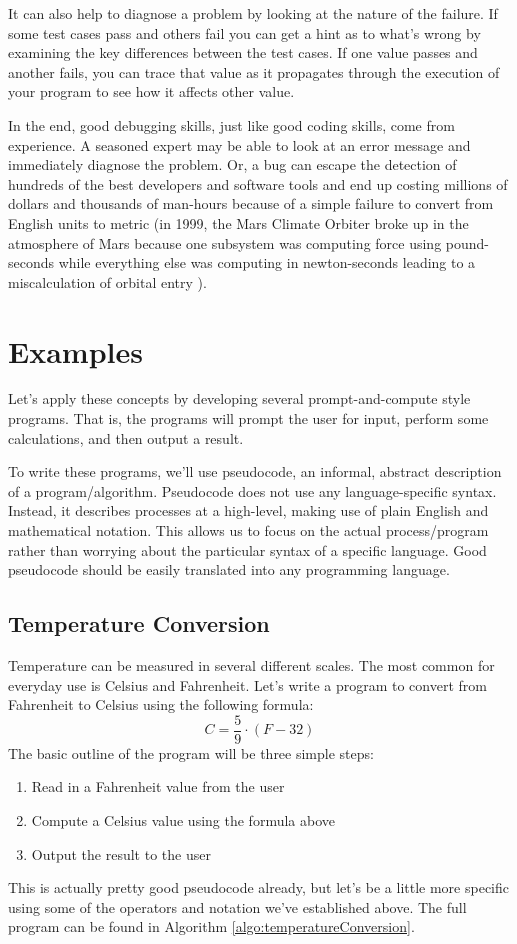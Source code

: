 It can also help to diagnose a problem by looking at the nature of
the failure.  If some test cases pass and others fail you can get a hint
as to what's wrong by examining the key differences between the test
cases.  If one value passes and another fails, you can trace that value
as it propagates through the execution of your program to see how
it affects other value.  

In the end, good debugging skills, just like good coding skills, come from
experience.  A seasoned expert may be able to look at an error message 
and immediately diagnose the problem.  Or, a bug can escape the detection
of hundreds of the best developers and software tools and end up costing 
millions of dollars and thousands of man-hours because of a simple failure to convert 
from English units to metric (in 1999, the Mars Climate Orbiter broke up in the 
atmosphere of Mars because one subsystem was computing force using
pound-seconds while everything else was computing in newton-seconds 
leading to a miscalculation of orbital entry \cite{mars1999}).

\section{Examples}

Let's apply these concepts by developing several prompt-and-compute style
programs.  That is, the programs will prompt the user for input, perform some
calculations, and then output a result.  

To write these programs, we'll use pseudocode, an informal, abstract description
of a program/algorithm.  Pseudocode does not use any language-specific syntax.
Instead, it describes processes at a high-level, making use of plain English
and mathematical notation.  This allows us to focus on the actual process/program
rather than worrying about the particular syntax of a specific language.  Good
pseudocode should be easily translated into any programming language.


\subsection{Temperature Conversion}

Temperature can be measured in several different scales.  The most common 
for everyday use is Celsius and Fahrenheit.  Let's write a program to convert
from Fahrenheit to Celsius using the following formula:
  $$C = \frac{5}{9} \cdot (F-32)$$
The basic outline of the program will be three simple steps:
\begin{enumerate}
  \item Read in a Fahrenheit value from the user
  \item Compute a Celsius value using the formula above
  \item Output the result to the user
\end{enumerate}
This is actually pretty good pseudocode already, but let's be a little
more specific using some of the operators and notation we've established
above.  The full program can be found in Algorithm \ref{algo:temperatureConversion}.

